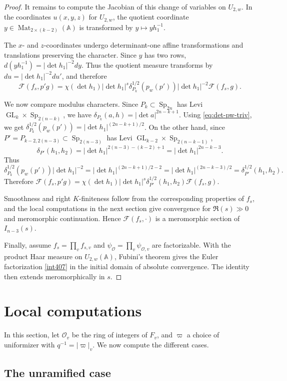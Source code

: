 \documentclass[11pt,notitlepage]{amsart}
\theoremstyle{definition}
\theoremstyle{remark}
\newcommand{\calF}{\mathcal{F}}
\newcommand{\calO}{\mathcal{O}}
\newcommand{\bbA}{\mathbb{A}}
\DeclareMathOperator{\GL}{GL}
\DeclareMathOperator{\Sp}{Sp}
\DeclareMathOperator{\Mat}{Mat}
\begin{document}
\begin{proof}
It remains to compute the Jacobian of this change of variables on \(U_{2,w}\).
In the coordinates \(u(x,y,z)\) for \(U_{2,w}\), the quotient coordinate  $y\in \Mat_{2\times(k-2)}(\bbA)$ is transformed by $y\longmapsto yh_1^{-1}$.

The \(x\)- and \(z\)-coordinates undergo determinant-one affine transformations and
translations preserving the character. Since \(y\) has two rows,
  $d(yh_1^{-1})=|\det h_1|^{-2}dy$. Thus the quotient measure transforms by $
  du=|\det h_1|^{-2}du'$, and therefore
\[
  \calF(f_s,p'g)
  =
  \chi(\det h_1)|\det h_1|^s
  \delta_{P_k}^{1/2}(p_w(p'))
  |\det h_1|^{-2}
  \calF(f_s,g).
\]

We now compare modulus characters. Since \(P_k\subset \Sp_{2n}\) has Levi
\(\GL_k\times \Sp_{2(n-k)}\), we have $ \delta_{P_k}(a,h)=|\det a|^{2n-k+1}$.
Using \eqref{eq:det-pw-triv}, we get
 $ \delta_{P_k}^{1/2}(p_w(p'))
  =
  |\det h_1|^{(2n-k+1)/2}$. On the other hand, since \(P'=P_{k-2,2(n-3)}\subset \Sp_{2(n-3)}\) has Levi
\(\GL_{k-2}\times \Sp_{2(n-k-1)}\),
\[
  \delta_{P'}(h_1,h_2)
  =
  |\det h_1|^{2(n-3)-(k-2)+1}
  =
  |\det h_1|^{2n-k-3}.
\]
Thus
\[
  \delta_{P_k}^{1/2}(p_w(p'))|\det h_1|^{-2}
  =
  |\det h_1|^{(2n-k+1)/2-2}
  =
  |\det h_1|^{(2n-k-3)/2}
  =
  \delta_{P'}^{1/2}(h_1,h_2).
\]
Therefore  $\calF(f_s,p'g)
  =
  \chi(\det h_1)|\det h_1|^s
  \delta_{P'}^{1/2}(h_1,h_2)
  \calF(f_s,g)$.

Smoothness and right \(K\)-finiteness follow from the corresponding properties of
\(f_s\), and the local computations in the next section give convergence for
\(\Re(s)\gg0\) and meromorphic continuation. Hence \(\calF(f_s,\cdot)\) is a
meromorphic section of \(I_{n-3}(s)\).

Finally, assume \(f_s=\prod_v f_{s,v}\) and
\(\psi_\calO=\prod_v\psi_{\calO,v}\) are factorizable. With the product Haar measure
on \(U_{2,w}(\bbA)\), Fubini's theorem gives the Euler factorization
\eqref{int407} in the initial domain of absolute convergence. The identity then
extends meromorphically in \(s\).
\end{proof}

\section{Local computations}
In this section, let $\calO_v$ be the ring of integers of $F_v$, and $\varpi$ a choice of uniformizer with $q^{-1} = |\varpi|_v$. We now compute the different cases.

\subsection{The unramified case}\label{sec501}
\end{document}
